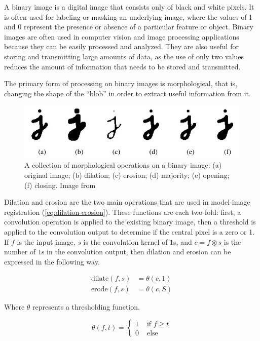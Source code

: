 A binary image is a digital image that consists only of black and white pixels. It is often used for labeling or masking an underlying image, where the values of 1 and 0 represent the presence or absence of a particular feature or object. Binary images are often used in computer vision and image processing applications because they can be easily processed and analyzed. They are also useful for storing and transmitting large amounts of data, as the use of only two values reduces the amount of information that needs to be stored and transmitted.

The primary form of processing on binary images is morphological, that is, changing the shape of the ``blob'' in order to extract useful information from it.

\begin{figure}[h!]
    \includegraphics[width = \linewidth]{figs/background/png/binary-image-processing.jpg}
    \caption{A collection of morphological operations on a binary image: (a) original image; (b) dilation; (c) erosion; (d) majority; (e) opening; (f) closing. Image from \cite{szeliskiComputerVisionAlgorithms2022}}
    \label{fig:binary-image-processing}
\end{figure}

Dilation and erosion are the two main operations that are used in model-image registration (\ref{eq:dilation-erosion}). These functions are each two-fold: first, a convolution operation is applied to the existing binary image, then a threshold is applied to the convolution output to determine if the central pixel is a zero or 1. If $f$ is the input image, $s$ is the convolution kernel of $1$s, and $c=f\otimes s$ is the number of $1$s in the convolution output, then dilation and erosion can be expressed in the following way.

\begin{equation}
    \begin{aligned}
        \text{dilate}(f,s) &= \theta(c,1) \\
        \text{erode}(f,s) &= \theta(c,S) 
    \end{aligned}
    \label{eq:dilation-erosion}
\end{equation}

Where $\theta$ represents a thresholding function.

\begin{equation}
    \theta (f,t) = \begin{cases}
        1 &\text{ if } f\ge t \\
        0 &\text{ else}
    \end{cases}
\end{equation}

